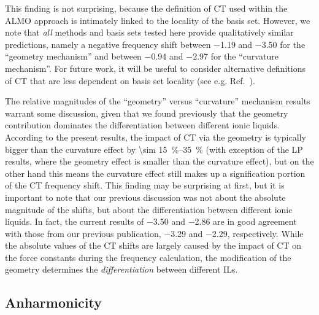 This finding is not surprising, because the definition of CT used within the ALMO approach is intimately linked to the locality of the basis set. However, we note that \emph{all} methods and basis sets tested here provide qualitatively similar predictions, namely a negative frequency shift between \num{-1.19} and \SI{-3.50}{\wavenumber} for the ``geometry mechanism'' and between \num{-0.94} and \SI{-2.97}{\wavenumber} for the ``curvature mechanism''. For future work, it will be useful to consider alternative definitions of CT that are less dependent on basis set locality (see e.g. Ref.~\citep{Lao2016a}).

The relative magnitudes of the ``geometry'' versus ``curvature'' mechanism results warrant some discussion, given that we found previously that the geometry contribution dominates the differentiation between different ionic liquids. According to the present results, the impact of CT via the geometry is typically bigger than the curvature effect by \SIrange{\sim 15}{35}{\percent} (with exception of the LP results, where the geometry effect is smaller than the curvature effect), but on the other hand this means the curvature effect still makes up a signification portion of the CT frequency shift. This finding may be surprising at first, but it is important to note that our previous discussion was not about the absolute magnitude of the shifts, but about the differentiation between different ionic liquids. In fact, the current results of \num{-3.50} and \SI{-2.86}{\wavenumber} are in good agreement with those from our previous publication, \SI{-3.29}{\wavenumber} and \SI{-2.29}{\wavenumber}, respectively. While the absolute values of the CT shifts are largely caused by the impact of CT on the force constants during the frequency calculation, the modification of the geometry determines the \emph{differentiation} between different ILs.

\subsection{Anharmonicity}
\label{paper_02:ssec:IIIB}

